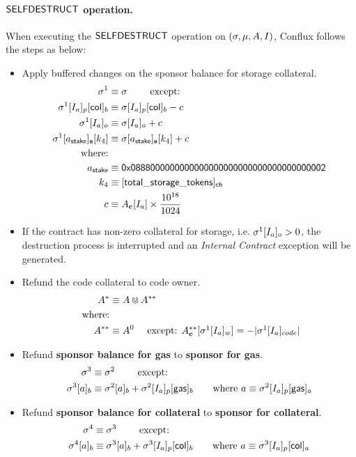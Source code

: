 \paragraph{$\mathsf{SELFDESTRUCT}$ operation.} When executing the $\mathsf{SELFDESTRUCT}$ operation on $(\mathbf{\sigma},\mu,A,I)$, Conflux follows the steps as below:
\begin{itemize}[nosep]
	\item Apply buffered changes on the sponsor balance for storage collateral. 
	\begin{align}
		\st^1  &\eqdef \st \qquad \mbox{ except:}\label{eq:suicide_start}\\
		\st^1[I_a]_p[{\sf col}]_b &\eqdef \st[I_a]_p[{\sf col}]_b - c \\
		\st^1[I_a]_o &\eqdef \st[I_a]_o + c \\
		\st^1[a_{\sf stake}]_{\bf s}[k_4] &\eqdef \st[a_{\sf stake}]_{\bf s}[k_4] + c \\
		\mbox{where:} & \\
		a_{\sf stake} &\eqdef \stakingcontract \\ 
		k_4 &\eqdef {\sf [total\char`_storage\char`_tokens]_{\sf ch}} \\ 
		c &\eqdef A_{\bf c}[I_a]\times \collateralperbyte 
	\end{align}

	\item If the contract has non-zero collateral for storage, i.e. $\mathbf{\sigma}^1[I_a]_o>0$, 
	the destruction process is interrupted and an \emph{Internal Contract} exception will be generated.

	\item Refund the code collateral to code owner. 
	\begin{align}
		A^{*} &\equiv A \Cup A^{**} \\ 
		\mbox{ where:}& \\ 
		A^{**} &\equiv A^0 \quad \mbox{ except: $A^{**}_{\bf c}[\mathbf{\sigma}^1[I_a]_w]=-|\mathbf{\sigma}^1[I_a]_{code}|$}
	\end{align}

	\item Refund {\bf sponsor balance for gas} to {\bf sponsor for gas}.
	\begin{align}
		\mathbf{\sigma}^3  &\equiv \mathbf{\sigma}^2 \qquad \mbox{  except:}\\
		\mathbf{\sigma}^3[a]_b&\equiv\mathbf{\sigma}^2[a]_b+\mathbf{\sigma}^2[I_a]_p[{\sf gas}]_b
		\qquad\text{where $a  \equiv \mathbf{\sigma}^2[I_a]_p[{\sf gas}]_a$}
	\end{align}

	\item Refund {\bf sponsor balance for collateral} to {\bf sponsor for collateral}.
	\begin{align}
		\mathbf{\sigma}^4  &\equiv \mathbf{\sigma}^3 \qquad \mbox{  except:}\\
		\mathbf{\sigma}^4[a]_b&\equiv\mathbf{\sigma}^3[a]_b+\mathbf{\sigma}^3[I_a]_p[{\sf col}]_b
		\qquad\text{where $a \equiv \mathbf{\sigma}^3[I_a]_p[{\sf col}]_a$}
	\end{align}


\end{itemize}
